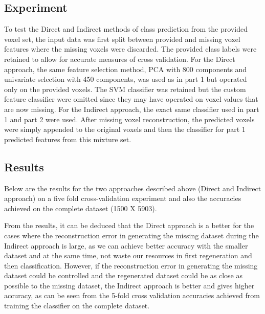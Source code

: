 \documentclass{article} %
\begin{document}
\subsection{Experiment}
To test the Direct and Indirect methods of class prediction from the provided voxel set, the input data was first split between provided and missing voxel features where the missing voxels were discarded.  The provided class labels were retained to allow for accurate measures of cross validation.  For the Direct approach, the same feature selection method, PCA with 800 components and univariate selection with 450 components, was used as in part 1 but operated only on the provided voxels. The SVM classifier was retained but the custom feature classifier were omitted since they may have operated on voxel values that are now missing. For the Indirect approach, the exact same classifier used in part 1 and part 2 were used. After missing voxel reconstruction, the predicted voxels were simply appended to the original voxels and then the classifier for part 1 predicted features from this mixture set.


\subsection{Results}

Below are the results for the two approaches described above (Direct and Indirect approach) on a five fold cross-validation experiment and also the accuracies achieved on the complete dataset (1500 X 5903). 

From the results, it can be deduced that the Direct approach is a better for the cases where the reconstruction error in generating the missing dataset during the Indirect approach is large, as we can achieve better accuracy with the smaller dataset and at the same time, not waste our resources in first regeneration and then classification. However, if the reconstruction error in generating the missing dataset could be controlled and the regenerated dataset could be as close as possible to the missing dataset, the Indirect approach is better and gives higher accuracy, as can be seen from the 5-fold cross validation accuracies achieved from training the classifier on the complete dataset.
\end{document}
